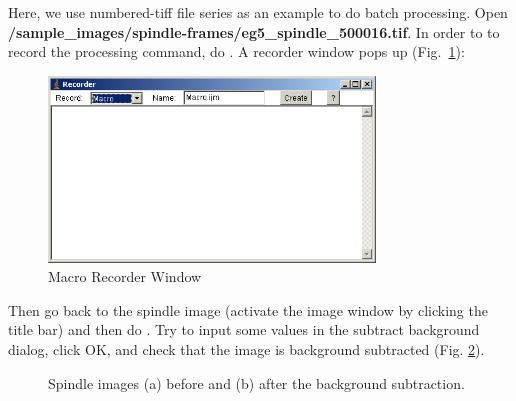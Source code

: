 \begin{indentexercise}{1}
Here, we use numbered-tiff file series as an example to do batch
processing. Open
\textbf{/sample\_images/spindle-frames/eg5\_spindle\_500016.tif}. In order to
to record the processing command, do . A recorder window pops up (Fig.~\ref{fig:img70}):

\begin{figure}[htbp]
\begin{center}
\includegraphics[width=8.678cm,height=4.942cm]{fig/CMCIBasicCourse201102-img70.png}
\caption{ Macro Recorder Window}
\label{fig:img70}
\end{center}
\end{figure}


Then go back to the spindle image (activate the image window by clicking
the title bar) and then do . Try to input some values in the subtract background dialog, click OK, and check that the image is background subtracted (Fig. \ref{fig:spindleBacksubtraction}). 


\begin{figure}[htbp]
 \centering
 \caption{ Spindle images (a) before and (b) after the
background subtraction.}
 \label{fig:spindleBacksubtraction}
\end{figure} 



\end{indentexercise}
